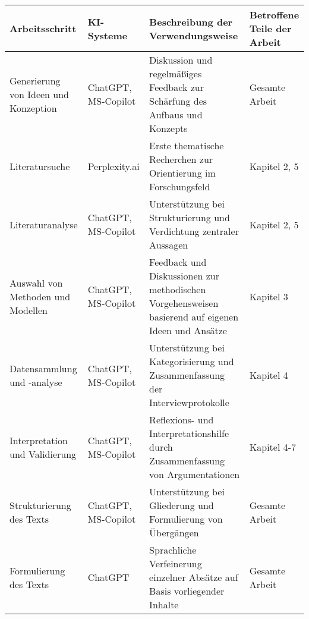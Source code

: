 \begin{table}[H]
  \scriptsize
  \begin{tabularx}{\textwidth}{|P{0.2\textwidth}|P{0.14\textwidth}|X|P{0.16\textwidth}|}
    \hline
    \textbf{Arbeitsschritt} &
    \textbf{KI-Systeme} &
    \textbf{Beschreibung der Verwendungsweise} &
    \textbf{Betroffene Teile der Arbeit} \\
    \hline
    Generierung von Ideen und Konzeption & ChatGPT, MS-Copilot & Diskussion und regelmäßiges Feedback zur Schärfung des Aufbaus und Konzepts & Gesamte Arbeit \\
    \hline
    Literatursuche & Perplexity.ai & Erste thematische Recherchen zur Orientierung im Forschungsfeld & Kapitel 2, 5 \\
    \hline
    Literaturanalyse & ChatGPT, MS-Copilot & Unterstützung bei Strukturierung und Verdichtung zentraler Aussagen & Kapitel 2, 5 \\
    \hline
    Auswahl von Methoden und Modellen & ChatGPT, MS-Copilot & Feedback und Diskussionen zur methodischen Vorgehensweisen basierend auf eigenen Ideen und Ansätze & Kapitel 3 \\
    \hline
    Datensammlung und -analyse & ChatGPT, MS-Copilot & Unterstützung bei Kategorisierung und Zusammenfassung der Interviewprotokolle & Kapitel 4 \\
    \hline
    Interpretation und Validierung & ChatGPT, MS-Copilot & Reflexions- und Interpretationshilfe durch Zusammenfassung von Argumentationen & Kapitel 4-7 \\
    \hline
    Strukturierung des Texts & ChatGPT, MS-Copilot & Unterstützung bei Gliederung und Formulierung von Übergängen & Gesamte Arbeit \\
    \hline
    Formulierung des Texts & ChatGPT & Sprachliche Verfeinerung einzelner Absätze auf Basis vorliegender Inhalte & Gesamte Arbeit \\
    \hline
  \end{tabularx}
\end{table}